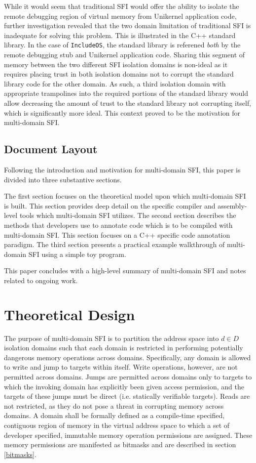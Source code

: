 \documentclass[12pt]{article}
\begin{document}
While it would seem that traditional SFI would offer the ability to isolate the remote debugging region of virtual memory from Unikernel application code, further investigation revealed that the two domain limitation of traditional SFI is inadequate for solving this problem. This is illustrated in the C++ standard library. In the case of \texttt{IncludeOS}, the standard library is referened \textit{both} by the remote debugging stub and Unikernel application code. Sharing this segment of memory between the two different SFI isolation domains is non-ideal as it requires placing trust in both isolation domains not to corrupt the standard library code for the other domain. As such, a third isolation domain with appropriate trampolines into the required portions of the standard library would allow decreasing the amount of trust to the standard library not corrupting itself, which is significantly more ideal. This context proved to be the motivation for multi-domain SFI.

\subsection{Document Layout}

Following the introduction and motivation for multi-domain SFI, this paper is divided into three substantive sections.

The first section focuses on the theoretical model upon which multi-domain SFI is built. This section provides deep detail on the specific compiler and assembly-level tools which multi-domain SFI utilizes. The second section describes the methods that developers use to annotate code which is to be compiled with multi-domain SFI. This section focuses on a C++ specific code annotation paradigm. The third section presents a practical example walkthrough of multi-domain SFI using a simple toy program.

This paper concludes with a high-level summary of multi-domain SFI and notes related to ongoing work.

\section{Theoretical Design}

The purpose of multi-domain SFI is to partition the address space into $d\in D$ isolation domains such that each domain is restricted in performing potentially dangerous memory operations across domains. Specifically, any domain is allowed to write and jump to targets within itself. Write operations, however, are not permitted across domains. Jumps are permitted across domains only to targets to which the invoking domain has explicitly been given access permission, and the targets of these jumps must be direct (i.e. statically verifiable targets). Reads are not restricted, as they do not pose a threat in corrupting memory across domains.  A domain shall be formally defined as a compile-time specified, contiguous region of memory in the virtual address space to which a set of developer specified, immutable memory operation permissions are assigned. These memory permissions are manifested as bitmasks and are described in section \ref{bitmasks}.
\end{document}
